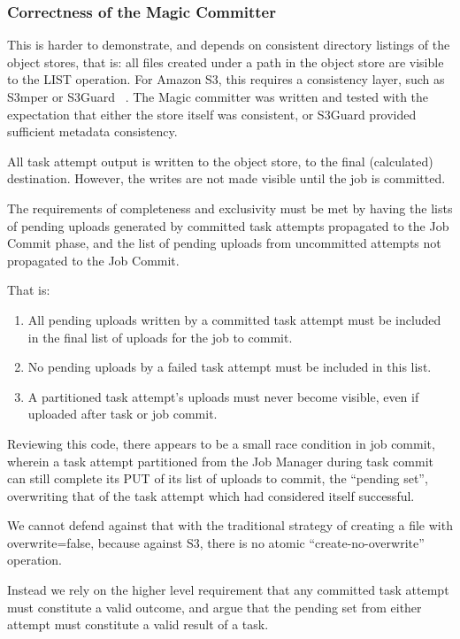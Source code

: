 \documentclass[conference]{IEEEtran}
\begin{document}
\subsubsection{Correctness of the Magic Committer}

This is harder to demonstrate, and depends on consistent directory
listings of the object stores, that is: all files created under a path
in the object store are visible to the LIST operation.
For Amazon S3, this requires a consistency layer, such as S3mper or S3Guard
\ \cite{S3mper,HADOOP-13345}.
The Magic committer was written and tested with the expectation that either the
store itself was consistent, or S3Guard provided sufficient metadata consistency.

All task attempt output is written to the object store, to the final (calculated)
destination.
However, the writes are not made visible until the job is committed.

The requirements of completeness and exclusivity must be met by
having the lists of pending uploads generated by committed task attempts propagated
to the Job Commit phase, and the list of pending uploads from uncommitted
attempts not propagated to the Job Commit.

That is:

\begin{enumerate}
  \item All pending uploads written by a committed task attempt must be
  included in the final list of uploads for the job to commit.
  \item No pending uploads by a failed task attempt must be included in this list.
  \item A partitioned task attempt's uploads must never become visible,
  even if uploaded after task or job commit.
\end{enumerate}


Reviewing this code, there appears to be a small race condition in job commit,
wherein a task attempt partitioned from the Job Manager during task commit
can still complete its PUT of its list of uploads to commit, the ``pending set'',
overwriting that of the task attempt which had considered itself successful.

We cannot defend against that with the traditional strategy of creating
a file with overwrite=false, because against S3, there is no atomic
``create-no-overwrite'' operation.

Instead we rely on the higher level requirement that any committed task attempt must
constitute a valid outcome, and argue that the pending set from either attempt
must constitute a valid result of a task.
\end{document}

